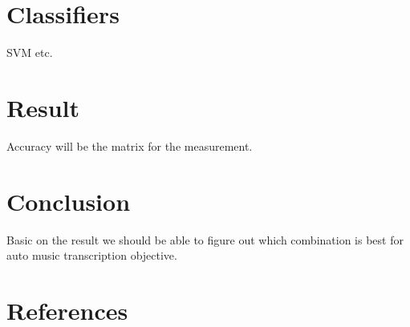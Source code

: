 \documentclass{article}
\begin{document}
\section{Classifiers}\label{sec:Classifiers}
SVM etc.


\section{Result}\label{sec:Result}
Accuracy will be the matrix for the measurement.

\section{Conclusion}\label{sec:Conclusion}
Basic on the result we should be able to figure out which combination is best for auto music transcription objective.



\section{References}




%
%
%
%
\end{document}

